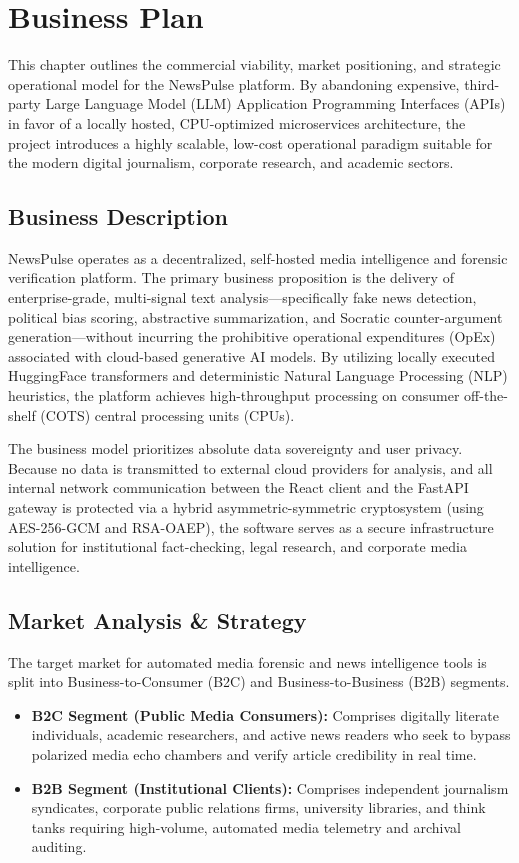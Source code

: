 \chapter{Business Plan}
\label{ch:business-plan-chapter}
\newpage

This chapter outlines the commercial viability, market positioning, and strategic operational model for the NewsPulse platform. By abandoning expensive, third-party Large Language Model (LLM) Application Programming Interfaces (APIs) in favor of a locally hosted, CPU-optimized microservices architecture, the project introduces a highly scalable, low-cost operational paradigm suitable for the modern digital journalism, corporate research, and academic sectors.

\section{Business Description}
NewsPulse operates as a decentralized, self-hosted media intelligence and forensic verification platform. The primary business proposition is the delivery of enterprise-grade, multi-signal text analysis—specifically fake news detection, political bias scoring, abstractive summarization, and Socratic counter-argument generation—without incurring the prohibitive operational expenditures (OpEx) associated with cloud-based generative AI models. By utilizing locally executed HuggingFace transformers and deterministic Natural Language Processing (NLP) heuristics, the platform achieves high-throughput processing on consumer off-the-shelf (COTS) central processing units (CPUs). 

The business model prioritizes absolute data sovereignty and user privacy. Because no data is transmitted to external cloud providers for analysis, and all internal network communication between the React client and the FastAPI gateway is protected via a hybrid asymmetric-symmetric cryptosystem (using AES-256-GCM and RSA-OAEP), the software serves as a secure infrastructure solution for institutional fact-checking, legal research, and corporate media intelligence.

\section{Market Analysis \& Strategy}
The target market for automated media forensic and news intelligence tools is split into Business-to-Consumer (B2C) and Business-to-Business (B2B) segments.
\begin{itemize}
    \item \textbf{B2C Segment (Public Media Consumers):} Comprises digitally literate individuals, academic researchers, and active news readers who seek to bypass polarized media echo chambers and verify article credibility in real time.
    \item \textbf{B2B Segment (Institutional Clients):} Comprises independent journalism syndicates, corporate public relations firms, university libraries, and think tanks requiring high-volume, automated media telemetry and archival auditing.
\end{itemize}

